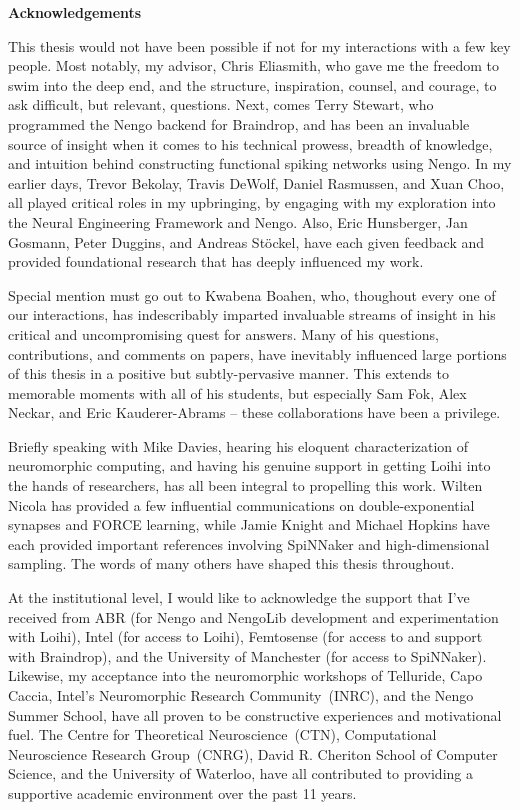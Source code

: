{}
\begin{center}\textbf{Acknowledgements}\end{center}

This thesis would not have been possible if not for my interactions with a few key people.
Most notably, my advisor, Chris Eliasmith, who gave me the freedom to swim into the deep end, and the structure, inspiration, counsel, and courage, to ask difficult, but relevant, questions.
Next, comes Terry Stewart, who programmed the Nengo backend for Braindrop, and has been an invaluable source of insight when it comes to his technical prowess, breadth of knowledge, and intuition behind constructing functional spiking networks using Nengo.
In my earlier days, Trevor Bekolay, Travis DeWolf, Daniel Rasmussen, and Xuan Choo, all played critical roles in my upbringing, by engaging with my exploration into the Neural Engineering Framework and Nengo.
Also, Eric Hunsberger, Jan Gosmann, Peter Duggins, and Andreas St{\"o}ckel, have each given feedback and provided foundational research that has deeply influenced my work.

Special mention must go out to Kwabena Boahen, who, thoughout every one of our interactions, has indescribably imparted invaluable streams of insight in his critical and uncompromising quest for answers.
Many of his questions, contributions, and comments on papers, have inevitably influenced large portions of this thesis in a positive but subtly-pervasive manner.
This extends to memorable moments with all of his students, but especially Sam Fok, Alex Neckar, and Eric Kauderer-Abrams -- these collaborations have been a privilege.

Briefly speaking with Mike Davies, hearing his eloquent characterization of neuromorphic computing, and having his genuine support in getting Loihi into the hands of researchers, has all been integral to propelling this work.
Wilten Nicola has provided a few influential communications on double-exponential synapses and FORCE learning, while Jamie Knight and Michael Hopkins have each provided important references involving SpiNNaker and high-dimensional sampling.
The words of many others have shaped this thesis throughout.

At the institutional level, I would like to acknowledge the support that I've received from
ABR (for Nengo and NengoLib development and experimentation with Loihi),
Intel (for access to Loihi),
Femtosense (for access to and support with Braindrop),
and the University of Manchester (for access to SpiNNaker).
Likewise, my acceptance into the neuromorphic workshops of Telluride, Capo Caccia, Intel's Neuromorphic Research Community~(INRC), and the Nengo Summer School, have all proven to be constructive experiences and motivational fuel.
The Centre for Theoretical Neuroscience~(CTN), Computational Neuroscience Research Group~(CNRG), David R. Cheriton School of Computer Science, and the University of Waterloo, have all contributed to providing a supportive academic environment over the past 11 years.  

